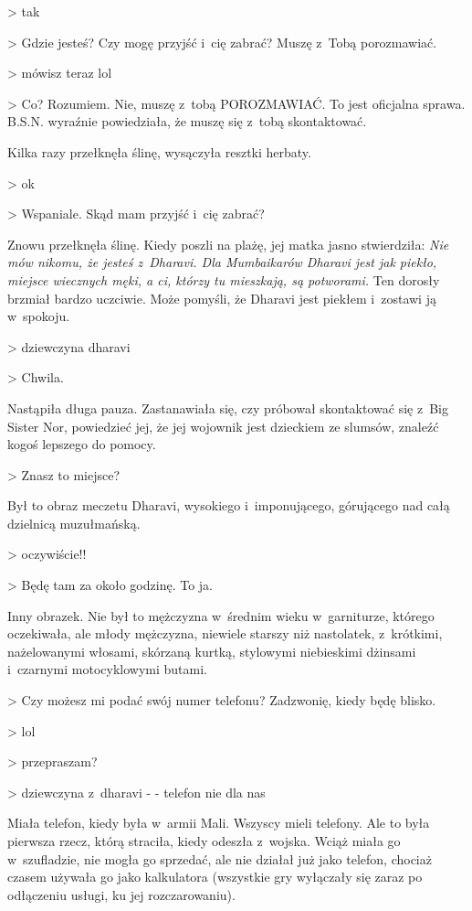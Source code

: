\documentclass[oneside,polish,11pt,rmheadings]{mwbk}
\begin{document}
{\textgreater} tak

{\textgreater} Gdzie jesteś? Czy mogę przyjść i~cię zabrać? Muszę z~Tobą porozmawiać.

{\textgreater} mówisz teraz lol

{\textgreater} Co? Rozumiem. Nie, muszę z~tobą POROZMAWIAĆ. To jest oficjalna sprawa. B.S.N. wyraźnie powiedziała, że muszę się z~tobą skontaktować.

Kilka razy przełknęła ślinę, wysączyła resztki herbaty.

{\textgreater} ok 

{\textgreater} Wspaniale. Skąd mam przyjść i~cię zabrać?

Znowu przełknęła ślinę. Kiedy poszli na plażę, jej matka jasno stwierdziła: \textit{Nie mów nikomu, że jesteś z~Dharavi. Dla Mumbaikarów Dharavi jest jak piekło, miejsce wiecznych męki, a ci, którzy tu mieszkają, są potworami. }Ten dorosły brzmiał bardzo uczciwie. Może pomyśli, że Dharavi jest piekłem i~zostawi ją w~spokoju.

{\textgreater} dziewczyna dharavi 

{\textgreater} Chwila.

Nastąpiła długa pauza. Zastanawiała się, czy próbował skontaktować się z~Big Sister Nor, powiedzieć jej, że jej wojownik jest dzieckiem ze slumsów, znaleźć kogoś lepszego do pomocy.

{\textgreater} Znasz to miejsce?

Był to obraz meczetu Dharavi, wysokiego i~imponującego, górującego nad całą dzielnicą muzułmańską.

{\textgreater} oczywiście!!

{\textgreater} Będę tam za około godzinę. To ja.

Inny obrazek. Nie był to mężczyzna w~średnim wieku w~garniturze, którego oczekiwała, ale młody mężczyzna, niewiele starszy niż nastolatek, z~krótkimi, nażelowanymi włosami, skórzaną kurtką, stylowymi niebieskimi dżinsami i~czarnymi motocyklowymi butami.

{\textgreater} Czy możesz mi podać swój numer telefonu? Zadzwonię, kiedy będę blisko.

{\textgreater} lol 

{\textgreater} przepraszam?

{\textgreater} dziewczyna z~dharavi - -  telefon nie dla nas

Miała telefon, kiedy była w~armii Mali. Wszyscy mieli telefony. Ale to była pierwsza rzecz, którą straciła, kiedy odeszła z~wojska. Wciąż miała go w~szufladzie, nie mogła go sprzedać, ale nie działał już jako telefon, chociaż czasem używała go jako kalkulatora (wszystkie gry wyłączały się zaraz po odłączeniu usługi, ku jej rozczarowaniu).
\end{document}
